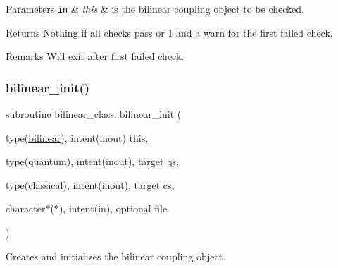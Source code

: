 \begin{DoxyParams}[1]{Parameters}
\mbox{\tt in}  & {\em this} & is the bilinear coupling object to be checked. \\
\hline
\end{DoxyParams}
\begin{DoxyReturn}{Returns}
Nothing if all checks pass or 1 and a warn for the first failed check. 
\end{DoxyReturn}
\begin{DoxyRemark}{Remarks}
Will exit after first failed check. 
\end{DoxyRemark}
\mbox{\label{namespacebilinear__class_a767f35cd3ebd5ef00f6a55fd775c3a27}} 
\subsubsection{\texorpdfstring{bilinear\+\_\+init()}{bilinear\_init()}}
{\footnotesize\ttfamily subroutine bilinear\+\_\+class\+::bilinear\+\_\+init (\begin{DoxyParamCaption}\item[{type(\hyperlink{structbilinear__class_1_1bilinear}{bilinear}), intent(inout)}]{this,  }\item[{type(\hyperlink{structquantum__class_1_1quantum}{quantum}), intent(inout), target}]{qs,  }\item[{type(\hyperlink{structclassical__class_1_1classical}{classical}), intent(inout), target}]{cs,  }\item[{character$\ast$($\ast$), intent(in), optional}]{file }\end{DoxyParamCaption})\hspace{0.3cm}{\ttfamily [private]}}



Creates and initializes the bilinear coupling object. 


